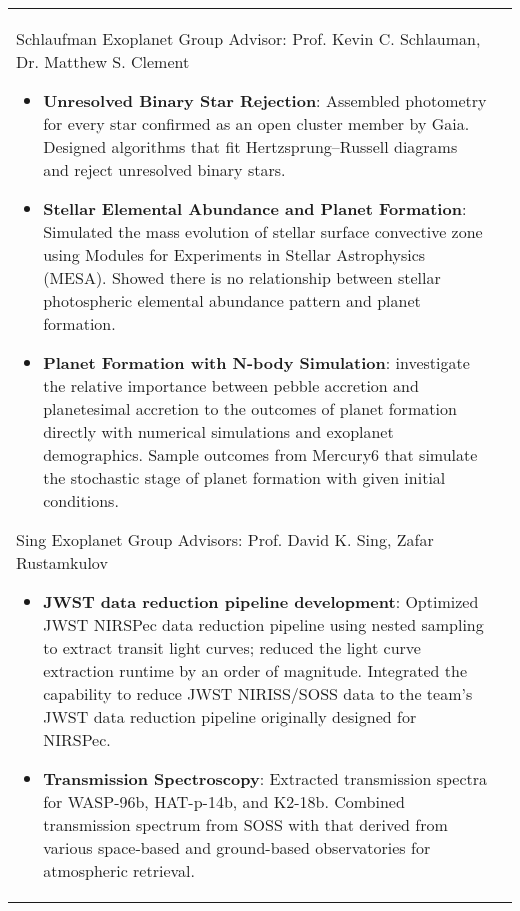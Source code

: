 \documentclass[10pt]{article} %
\begin{document}



\begin{supertabular}{L{4cm}@{\hskip 0.3in}L{13cm}} %

{\normalsize Schlaufman Exoplanet Group} %
{Advisor: Prof. Kevin C. Schlauman, Dr. Matthew S. Clement} %
{\begin{itemize}
\vspace{-0.4cm}
    \item \textbf{Unresolved Binary Star Rejection}:  Assembled photometry for every star confirmed as an open cluster member by Gaia. Designed algorithms that fit Hertzsprung–Russell diagrams and reject unresolved binary stars.
    \item \textbf{Stellar Elemental Abundance and Planet Formation}: Simulated the mass evolution of stellar surface convective zone using Modules for Experiments in Stellar Astrophysics (MESA). Showed there is no relationship between stellar photospheric elemental abundance pattern and planet formation.
    \item \textbf{Planet Formation with N-body Simulation}: investigate the relative importance between pebble accretion and planetesimal accretion to the outcomes of planet formation directly with numerical simulations and exoplanet demographics. Sample outcomes from Mercury6 that simulate the stochastic stage of planet formation with given initial conditions.
\end{itemize}} %

{\normalsize Sing Exoplanet Group} %
{Advisors: Prof. David K. Sing, Zafar Rustamkulov} %
{\begin{itemize}
\vspace{-0.4cm}
    \item \textbf{JWST data reduction pipeline development}: Optimized JWST NIRSPec data reduction pipeline using nested sampling to extract transit light curves; reduced the light curve extraction runtime by an order of magnitude. Integrated the capability to reduce JWST NIRISS/SOSS data to the team's JWST data reduction pipeline originally designed for NIRSPec.
    \item \textbf{Transmission Spectroscopy}:  Extracted transmission spectra for WASP-96b, HAT-p-14b, and K2-18b. Combined transmission spectrum from SOSS with that derived from various space-based and ground-based observatories for atmospheric retrieval. 
\end{itemize}} %


\end{supertabular}
\end{document}
